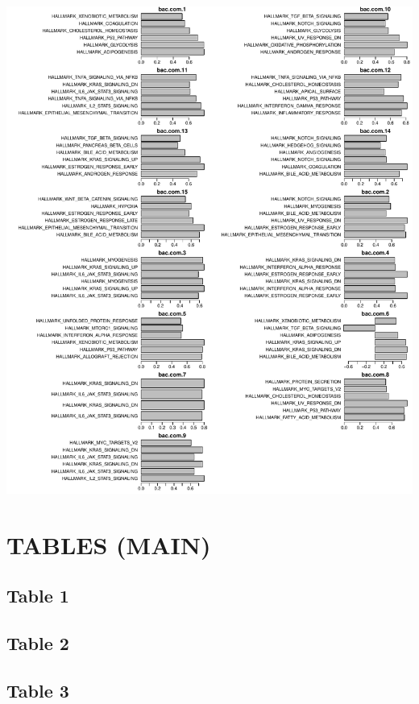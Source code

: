 \documentclass[
]{article}
\begin{document}
\includegraphics[width=1\linewidth]{manuscript_template_files/figure-latex/unnamed-chunk-13-1}

\clearpage

\hypertarget{tables-main}{%
\section{TABLES (MAIN)}\label{tables-main}}

\hypertarget{table-1}{%
\subsection{Table 1}\label{table-1}}

\clearpage

\hypertarget{table-2}{%
\subsection{Table 2}\label{table-2}}

\clearpage

\hypertarget{table-3}{%
\subsection{Table 3}\label{table-3}}
\end{document}
